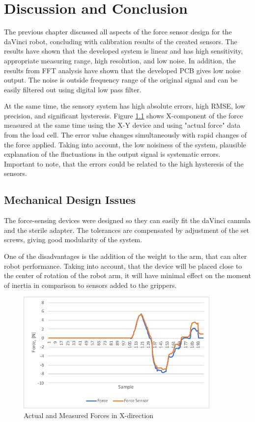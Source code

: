 \chapter{Discussion and Conclusion}
\label{discuss} %
The previous chapter discussed all aspects of the force sensor design for the daVinci robot, concluding with calibration results of the created sensors. The results have shown that the developed system is linear and has high sensitivity, appropriate measuring range, high resolution, and low noise. In addition, the results from FFT analysis have shown that the developed PCB gives low noise output. The noise is outside frequency range of the original signal and can be easily filtered out using digital low pass filter.

At the same time, the sensory system has high absolute errors, high RMSE, low precision, and significant hysteresis. Figure \ref{fig:Syst_err} shows X-component of the force measured at the same time using the X-Y device and using "actual force" data from the load cell. The error value changes simultaneously with rapid changes of the force applied. Taking into account, the low noisiness of the system, plausible explanation of the fluctuations in the output signal is systematic errors. Important to note, that the errors could be related to the high hysteresis of the sensors.

\section{Mechanical Design Issues}

The force-sensing devices were designed so they can easily fit the daVinci cannula and the sterile adapter. The tolerances are compensated by adjustment of the set screws, giving good modularity of the system.

One of the disadvantages is the addition of the weight to the arm, that can alter robot performance. Taking into account, that the device will be placed close to the center of rotation of the robot arm, it will have minimal effect on the moment of inertia in comparison to sensors added to the grippers.

\begin{figure}[h]
	\begin{center}
	\includegraphics[width=100mm]{fig/results/syst_error.pdf}
	\end{center}
	\vspace{-4mm}
	\caption[Actual and Measured Forces in X-direction]
	{Actual and Measured Forces in X-direction}
	\label{fig:Syst_err}
	\vspace{-2mm}
\end{figure}


